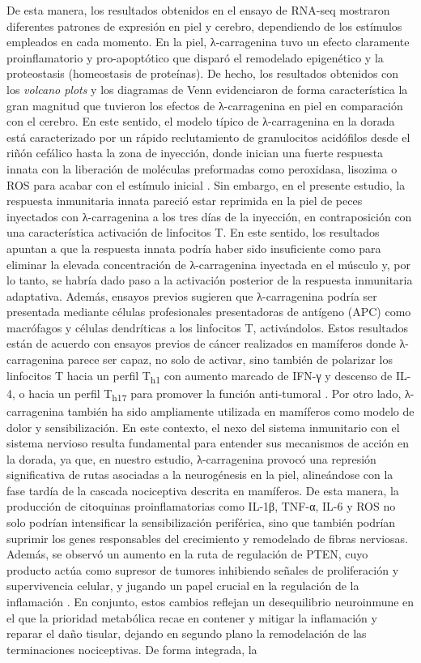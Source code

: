 \documentclass[10pt,a4paper]{article}
\begin{document}
\clearpage
De esta manera, los resultados obtenidos en el ensayo de RNA-seq mostraron diferentes patrones de expresión en piel y cerebro, dependiendo de los estímulos empleados en cada momento. En la piel, λ-carragenina tuvo un efecto claramente proinflamatorio y pro-apoptótico que disparó el remodelado epigenético y la proteostasis (homeostasis de proteínas). De hecho, los resultados obtenidos con los \textit{volcano plots} y los diagramas de Venn evidenciaron de forma característica la gran magnitud que tuvieron los efectos de λ-carragenina en piel en comparación con el cerebro. En este sentido, el modelo típico de λ-carragenina en la dorada está caracterizado por un rápido reclutamiento de granulocitos acidófilos desde el riñón cefálico hasta la zona de inyección, donde inician una fuerte respuesta innata con la liberación de moléculas preformadas como peroxidasa, lisozima o ROS para acabar con el estímulo inicial \parencite{CamposSanchez2021c}. Sin embargo, en el presente estudio, la respuesta inmunitaria innata pareció estar reprimida en la piel de peces inyectados con λ-carragenina a los tres días de la inyección, en contraposición con una característica activación de linfocitos T. En este sentido, los resultados apuntan a que la respuesta innata podría haber sido insuficiente como para eliminar la elevada concentración de λ-carragenina inyectada en el músculo y, por lo tanto, se habría dado paso a la activación posterior de la respuesta inmunitaria adaptativa. Además, ensayos previos sugieren que λ-carragenina podría ser presentada mediante células profesionales presentadoras de antígeno (APC) como macrófagos y células dendríticas a los linfocitos T, activándolos. Estos resultados están de acuerdo con ensayos previos de cáncer realizados en mamíferos donde λ-carragenina parece ser capaz, no solo de activar, sino también de polarizar los linfocitos T hacia un perfil T\textsubscript{h1} con aumento marcado de IFN-γ y descenso de IL-4, o hacia un perfil T\textsubscript{h17} para promover la función anti-tumoral \parencite{Tsuji2003,Luo2015}. Por otro lado, λ-carragenina también ha sido ampliamente utilizada en mamíferos como modelo de dolor y sensibilización. En este contexto, el nexo del sistema inmunitario con el sistema nervioso resulta fundamental para entender sus mecanismos de acción en la dorada, ya que, en nuestro estudio, λ-carragenina provocó una represión significativa de rutas asociadas a la neurogénesis en la piel, alineándose con la fase tardía de la cascada nociceptiva descrita en mamíferos. De esta manera, la producción de citoquinas proinflamatorias como IL-1β, TNF-α, IL-6 y ROS no solo podrían intensificar la sensibilización periférica, sino que también podrían suprimir los genes responsables del crecimiento y remodelado de fibras nerviosas. Además, se observó un aumento en la ruta de regulación de PTEN, cuyo producto actúa como supresor de tumores inhibiendo señales de proliferación y supervivencia celular, y jugando un papel crucial en la regulación de la inflamación \parencite{Li2021}. En conjunto, estos cambios reflejan un desequilibrio neuroinmune en el que la prioridad metabólica recae en contener y mitigar la inflamación y reparar el daño tisular, dejando en segundo plano la remodelación de las terminaciones nociceptivas. De forma integrada, la 
\end{document}
